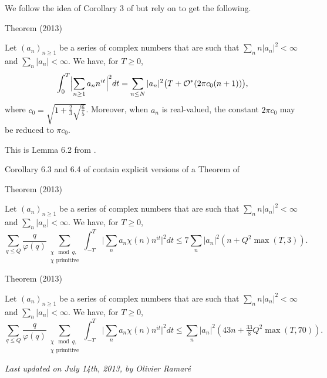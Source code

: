 We follow the idea of Corollary 3 of
\cite{Montgomery-Vaughan*74}
but rely on
\cite{Preissmann*84} to get the following.
\par 
\begin{thm}{Theorem (2013)}

  Let $(a_n)_{n\ge1}$ be a series of complex numbers that are such that
  $\sum_n n|a_n|^2 < \infty$ and $\sum_n |a_n| < \infty$. We have, for $T\ge0$,
  \begin{equation*}
    \int_0^T\Bigl|
    \sum_{n\ge1} a_{n}n^{it}
    \Bigr|^{2}dt = 
    \sum_{n\le N}|a_n|^2 \bigl(T+\mathcal{O}^*(2\pi c_0(n+1))\bigr),
  \end{equation*}
  where $c_0=\sqrt{1+\frac23\sqrt{\frac{6}{5}}}$. Moreover, when $a_n$ is
  real-valued, the constant $2\pi c_0$ may be reduced to $\pi c_0$.
\end{thm}

This is Lemma 6.2 from \cite{Ramare*13d}.

\par 
Corollary 6.3 and 6.4 of
\cite{Ramare*13d}
contain explicit versions of a Theorem of
\cite{Gallagher*70}

\par 
\begin{thm}{Theorem (2013)}

  Let $(a_n)_{n\ge1}$ be a series of complex numbers that are such that
  $\sum_n n|a_n|^2 < \infty$ and $\sum_n |a_n| < \infty$. We have, for $T\ge0$,
  $$
  \sum_{q\le Q}\frac{q}{\varphi(q)}
  \sum_{\substack{\chi\mod q,\\ \text{$\chi$ primitive}}}
  \int_{-T}^T
    \biggl|\sum_{n}a_n \chi(n)n^{it}\biggr|^2dt
    \le
    7
    \sum_{n}|a_n|^2( n+ Q^2\max(T, 3) ).
  $$
\end{thm}


\par 
\begin{thm}{Theorem (2013)}

  Let $(a_n)_{n\ge1}$ be a series of complex numbers that are such that
  $\sum_n n|a_n|^2 < \infty$ and $\sum_n |a_n| < \infty$. We have, for $T\ge0$,
  $$
  \sum_{q\le Q}\frac{q}{\varphi(q)}
  \sum_{\substack{\chi\mod q,\\ \text{$\chi$ primitive}}}
  \int_{-T}^T
    \biggl|\sum_{n}a_n \chi(n)n^{it}\biggr|^2dt
    \le
    \sum_{n}|a_n|^2( 43n+ \tfrac{33}{8} Q^2\max(T, 70) ).
  $$
\end{thm}




 
 








  
\begin{flushright}\small\sl{}   Last updated on July 14th, 2013, by Olivier Ramar\'e
 \end{flushright}
















